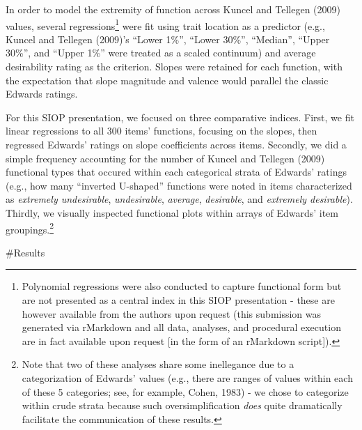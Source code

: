 \documentclass[
  english,
  ,jou]{apa6}
\begin{document}
In order to model the extremity of function across Kuncel and Tellegen (2009) values, several regressions\footnote{Polynomial regressions were also conducted to capture functional form but are not presented as a central index in this SIOP presentation - these are however available from the authors upon request (this submission was generated via rMarkdown and all data, analyses, and procedural execution are in fact available upon request {[}in the form of an rMarkdown script{]}).} were fit using trait location as a predictor (e.g., Kuncel and Tellegen (2009)'s \enquote{Lower 1\%}, \enquote{Lower 30\%}, \enquote{Median}, \enquote{Upper 30\%}, and \enquote{Upper 1\%} were treated as a scaled continuum) and average desirability rating as the criterion. Slopes were retained for each function, with the expectation that slope magnitude and valence would parallel the classic Edwards ratings.

For this SIOP presentation, we focused on three comparative indices. First, we fit linear regressions to all 300 items' functions, focusing on the slopes, then regressed Edwards' ratings on slope coefficients across items. Secondly, we did a simple frequency accounting for the number of Kuncel and Tellegen (2009) functional types that occured within each categorical strata of Edwards' ratings (e.g., how many \enquote{inverted U-shaped} functions were noted in items characterized as \emph{extremely undesirable}, \emph{undesirable}, \emph{average}, \emph{desirable}, and \emph{extremely desirable}). Thirdly, we visually inspected functional plots within arrays of Edwards' item groupings.\footnote{Note that two of these analyses share some inellegance due to a categorization of Edwards' values (e.g., there are ranges of values within each of these 5 categories; see, for example, Cohen, 1983) - we chose to categorize within crude strata because such oversimplification \emph{does} quite dramatically facilitate the communication of these results.}

\#Results
\end{document}

